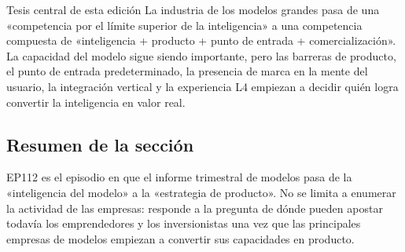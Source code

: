 \begin{importantbox}{Tesis central de esta edición}
La industria de los modelos grandes pasa de una «competencia por el límite superior de la inteligencia» a una competencia compuesta de «inteligencia + producto + punto de entrada + comercialización». La capacidad del modelo sigue siendo importante, pero las barreras de producto, el punto de entrada predeterminado, la presencia de marca en la mente del usuario, la integración vertical y la experiencia L4 empiezan a decidir quién logra convertir la inteligencia en valor real.
\end{importantbox}

\subsection{Resumen de la sección}

EP112 es el episodio en que el informe trimestral de modelos pasa de la «inteligencia del modelo» a la «estrategia de producto». No se limita a enumerar la actividad de las empresas: responde a la pregunta de dónde pueden apostar todavía los emprendedores y los inversionistas una vez que las principales empresas de modelos empiezan a convertir sus capacidades en producto.
